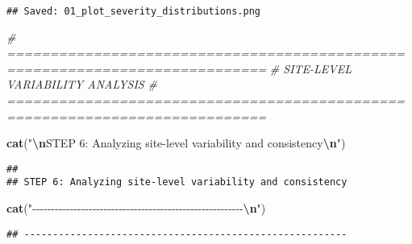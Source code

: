 \documentclass[
]{article}
\newenvironment{Shaded}{\begin{snugshade}}{\end{snugshade}}
\newcommand{\CommentTok}[1]{\textcolor[rgb]{0.56,0.35,0.01}{\textit{#1}}}
\newcommand{\FunctionTok}[1]{\textcolor[rgb]{0.13,0.29,0.53}{\textbf{#1}}}
\newcommand{\NormalTok}[1]{#1}
\newcommand{\SpecialCharTok}[1]{\textcolor[rgb]{0.81,0.36,0.00}{\textbf{#1}}}
\newcommand{\StringTok}[1]{\textcolor[rgb]{0.31,0.60,0.02}{#1}}
\begin{document}
\begin{verbatim}
## Saved: 01_plot_severity_distributions.png
\end{verbatim}

\begin{Shaded}
\begin{Highlighting}[]
\CommentTok{\# ============================================================================}
\CommentTok{\# SITE{-}LEVEL VARIABILITY ANALYSIS}
\CommentTok{\# ============================================================================}

\FunctionTok{cat}\NormalTok{(}\StringTok{"}\SpecialCharTok{\textbackslash{}n}\StringTok{STEP 6: Analyzing site{-}level variability and consistency}\SpecialCharTok{\textbackslash{}n}\StringTok{"}\NormalTok{)}
\end{Highlighting}
\end{Shaded}

\begin{verbatim}
## 
## STEP 6: Analyzing site-level variability and consistency
\end{verbatim}

\begin{Shaded}
\begin{Highlighting}[]
\FunctionTok{cat}\NormalTok{(}\StringTok{"{-}{-}{-}{-}{-}{-}{-}{-}{-}{-}{-}{-}{-}{-}{-}{-}{-}{-}{-}{-}{-}{-}{-}{-}{-}{-}{-}{-}{-}{-}{-}{-}{-}{-}{-}{-}{-}{-}{-}{-}{-}{-}{-}{-}{-}{-}{-}{-}{-}{-}{-}{-}{-}{-}{-}{-}}\SpecialCharTok{\textbackslash{}n}\StringTok{"}\NormalTok{)}
\end{Highlighting}
\end{Shaded}

\begin{verbatim}
## --------------------------------------------------------
\end{verbatim}
\end{document}
